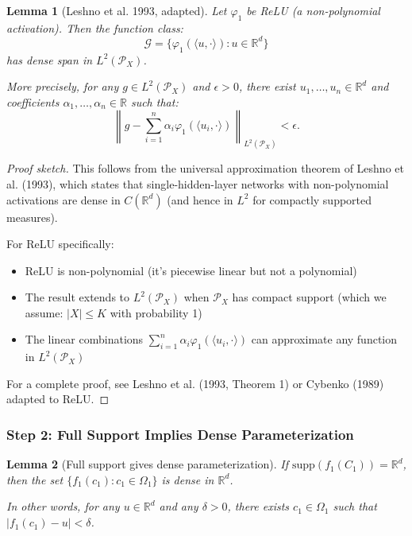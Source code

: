\documentclass[11pt]{article}
\newcommand{\1}{\mathbbm{1}}
\newtheorem{lemma}{Lemma}
\begin{document}
\begin{lemma}[Leshno et al. 1993, adapted]
\label{lem:leshno-relu}
Let $\varphi_1$ be ReLU (a non-polynomial activation). Then the function class:
\[
\mathcal{G} = \{\varphi_1(\langle u, \cdot\rangle) : u \in \mathbb{R}^d\}
\]
has dense span in $L^2(\mathcal{P}_X)$.

More precisely, for any $g \in L^2(\mathcal{P}_X)$ and $\epsilon > 0$, there exist $u_1, \ldots, u_n \in \mathbb{R}^d$ and coefficients $\alpha_1, \ldots, \alpha_n \in \mathbb{R}$ such that:
\[
\left\|g - \sum_{i=1}^n \alpha_i \varphi_1(\langle u_i, \cdot\rangle)\right\|_{L^2(\mathcal{P}_X)} < \epsilon.
\]
\end{lemma}

\begin{proof}[Proof sketch]
This follows from the universal approximation theorem of Leshno et al. (1993), which states that single-hidden-layer networks with non-polynomial activations are dense in $C(\mathbb{R}^d)$ (and hence in $L^2$ for compactly supported measures).

For ReLU specifically:
\begin{itemize}
\item ReLU is non-polynomial (it's piecewise linear but not a polynomial)
\item The result extends to $L^2(\mathcal{P}_X)$ when $\mathcal{P}_X$ has compact support (which we assume: $|X| \le K$ with probability 1)
\item The linear combinations $\sum_{i=1}^n \alpha_i \varphi_1(\langle u_i, \cdot\rangle)$ can approximate any function in $L^2(\mathcal{P}_X)$
\end{itemize}

For a complete proof, see Leshno et al. (1993, Theorem 1) or Cybenko (1989) adapted to ReLU.
\end{proof}

\subsubsection{Step 2: Full Support Implies Dense Parameterization}

\begin{lemma}[Full support gives dense parameterization]
\label{lem:dense-parameterization}
If $\text{supp}(f_1(C_1)) = \mathbb{R}^d$, then the set $\{f_1(c_1) : c_1 \in \Omega_1\}$ is dense in $\mathbb{R}^d$.

In other words, for any $u \in \mathbb{R}^d$ and any $\delta > 0$, there exists $c_1 \in \Omega_1$ such that $|f_1(c_1) - u| < \delta$.
\end{lemma}
\end{document}

